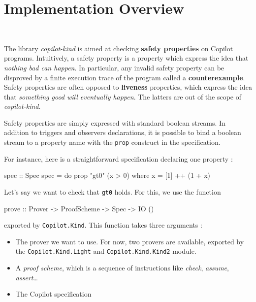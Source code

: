 \section{Implementation Overview}~\label{sec:overview}






The library \emph{copilot-kind} is aimed at checking \textbf{safety properties} on
Copilot programs. Intuitively, a safety property is a property which
express the idea that \emph{nothing bad can happen}. In particular, any
invalid safety property can be disproved by a finite execution trace of
the program called a \textbf{counterexample}. Safety properties are
often opposed to \textbf{liveness} properties, which express the idea
that \emph{something good will eventually happen}. The latters are out
of the scope of \emph{copilot-kind}.

Safety properties are simply expressed with standard boolean streams. In
addition to triggers and observers declarations, it is possible to bind
a boolean stream to a property name with the \texttt{prop} construct in
the specification.

For instance, here is a straightforward specification declaring one
property :
\begin{code}
spec :: Spec
spec = do
  prop "gt0" (x > 0)
  where
    x = [1] ++ (1 + x)
\end{code}


Let's say we want to check that \texttt{gt0} holds. For this, we use
the function

\begin{code}
    prove :: Prover -> ProofScheme -> Spec -> IO ()
\end{code}

exported by \texttt{Copilot.Kind}. This function takes three
arguments :

\begin{itemize}
\itemsep1pt\parskip0pt
\item
  The prover we want to use. For now, two provers are available,
  exported by the \texttt{Copilot.Kind.Light} and
  \texttt{Copilot.Kind.Kind2} module.
\item
  A \emph{proof scheme}, which is a sequence of instructions like
  \emph{check}, \emph{assume}, \emph{assert}\ldots{}
\item
  The Copilot specification
\end{itemize}


